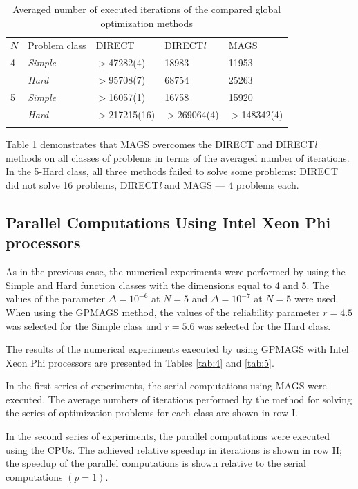 \documentclass{aims}
\theoremstyle{definition}
\begin{document}
\begin{table}
  \caption{Averaged number of executed iterations of the compared global optimization methods}
  \label{tab:3}
  \center
  \begin{tabular}{lllll}
    \hline\noalign{\smallskip}
     $N$ & Problem class & DIRECT & DIRECT\textit{l} & MAGS \\
    \noalign{\smallskip} \hline \noalign{\smallskip}
      4 &	\textit{Simple}	& $>$47282(4) &	18983 &	11953 \\
        & \textit{Hard} &	$>$95708(7) &	68754 &	25263 \\
      5	& \textit{Simple} &	$>$16057(1) &	16758 &	15920 \\
        & \textit{Hard} &	$>$217215(16) &	$>$269064(4) & $>$148342(4) \\
    \noalign{\smallskip}\hline
  \end{tabular}
\end{table}

Table \ref{tab:3} demonstrates that MAGS overcomes the DIRECT and DIRECT\textit{l} methods
on all classes of problems in terms of the averaged number of iterations.
In the 5-Hard class, all three methods failed to solve some problems: DIRECT did not
solve 16 problems, DIRECT\textit{l} and MAGS --- 4 problems each.

\subsection{Parallel Computations Using Intel Xeon Phi processors}
As in the previous case, the numerical experiments were performed by using the Simple
and Hard function classes with the dimensions equal to 4 and 5. The values of the
parameter \(\Delta=10^{-6}\) at \(N=5\) and \(\Delta=10^{-7}\) at \(N=5\) were used.
When using the GPMAGS method, the values of the reliability parameter \(r=4.5\) was
selected for the Simple class and \(r=5.6\) was selected for the Hard class.

The results of the numerical experiments executed by using GPMAGS with Intel Xeon Phi processors are presented in Tables \ref{tab:4} and \ref{tab:5}.

In the first series of experiments, the serial computations using MAGS were executed.
The average numbers of iterations performed by the method for solving the series of optimization problems
for each class are shown in row I.

In the second series of experiments, the parallel computations were executed using the CPUs.
The achieved relative speedup in iterations is shown in row II; the speedup of the
parallel computations is shown relative to the serial computations \((p=1)\).
\end{document}
